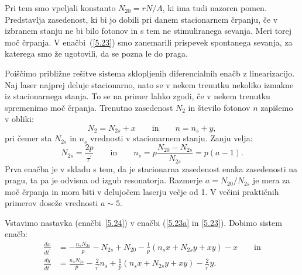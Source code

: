 Pri tem smo vpeljali konstanto $N_{20}= rN/A$, ki ima tudi nazoren pomen.
Predstavlja zasedenost, ki bi jo dobili pri danem stacionarnem črpanju, če v
izbranem stanju ne bi bilo fotonov in s tem ne stimuliranega sevanja. Meri torej 
moč črpanja. V enačbi~(\ref{5.23})
smo zanemarili prispevek spontanega sevanja, za katerega smo že ugotovili,
da se pozna le do praga.

Poiščimo približne rešitve sistema sklopljenih diferencialnih enačb z 
linearizacijo. Naj laser najprej deluje stacionarno, nato se v nekem trenutku  
nekoliko izmakne iz stacionarnega stanja. To se na primer lahko zgodi, če v nekem 
trenutku spremenimo moč črpanja. Trenutno zasedenost $N_2$ in število fotonov $n$
zapišemo v obliki:
\begin{equation}  
N_2= N_{2s}+x \qquad \mathrm{in} \qquad n=n_s+y,
\label{5.24}
\end{equation}
pri čemer sta $N_{2s}$ in $n_s$ vrednosti v stacionarnem stanju. Zanju velja: 
\begin{equation}  
N_{2s}=\frac{2p}{\tau^{\prime}}\qquad \mathrm{in}\qquad  
n_s=p\frac{N_{20}-N_{2s}}{N_{2s}}=p(a-1).
\label{5.26}
\end{equation}
Prva enačba je v skladu s tem, da je stacionarna zasedenost 
enaka zasedenosti na pragu, ta pa je odvisna od izgub resonatorja. 
Razmerje $a=N_{20}/N_{2s}$ je mera za moč črpanja in
mora biti v delujočem laserju večje od 1. V večini praktičnih primerov
doseže vrednosti $a \sim 5$.

Vstavimo nastavka (enačbi~\ref{5.24}) v enačbi (\ref{5.23a} in \ref{5.23}). 
Dobimo sistem enačb:
\begin{align}  
\frac{d x}{d t^{\prime}} &=-\frac{n_sN_{2s}}{p}-N_{2s}+N_{20}- \frac{1}{p}
(n_sx+N_{2s}y+xy)-x \qquad \mathrm{in}\\
\frac{d y}{d t^{\prime}} &= \frac{n_sN_{2s}}{p}-\frac{2}{\tau^{\prime}}n_s
+ \frac{1}{p}(n_s x+N_{2s} y+xy)-\frac{2}{\tau^{\prime}}y.
\label{5.27}
\end{align}


